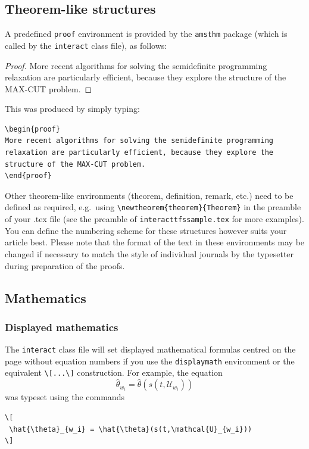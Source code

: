 \documentclass[]{interact}
\theoremstyle{plain}%
\theoremstyle{definition}
\theoremstyle{remark}
\begin{document}
\subsection{Theorem-like structures}

A predefined \verb"proof" environment is provided by the \texttt{amsthm} package (which is called by the \texttt{interact} class file), as follows:
\begin{proof}
More recent algorithms for solving the semidefinite programming relaxation are particularly efficient, because they explore the structure of the MAX-CUT problem.
\end{proof}
\noindent This was produced by simply typing:
\begin{verbatim}
\begin{proof}
More recent algorithms for solving the semidefinite programming
relaxation are particularly efficient, because they explore the
structure of the MAX-CUT problem.
\end{proof}
\end{verbatim}
Other theorem-like environments (theorem, definition, remark, etc.) need to be defined as required, e.g.\ using \verb"\newtheorem{theorem}{Theorem}" in the preamble of your .tex file (see the preamble of \verb"interacttfssample.tex" for more examples). You can define the numbering scheme for these structures however suits your article best. Please note that the format of the text in these environments may be changed if necessary to match the style of individual journals by the typesetter during preparation of the proofs.


\subsection{Mathematics}

\subsubsection{Displayed mathematics}

The \texttt{interact} class file will set displayed mathematical formulas centred on the page without equation numbers if you use the \texttt{displaymath} environment or the equivalent \verb"\[...\]" construction. For example, the equation
\[
 \hat{\theta}_{w_i} = \hat{\theta}(s(t,\mathcal{U}_{w_i}))
\]
was typeset using the commands
\begin{verbatim}
\[
 \hat{\theta}_{w_i} = \hat{\theta}(s(t,\mathcal{U}_{w_i}))
\]
\end{verbatim}
\end{document}
